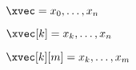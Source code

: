 \documentclass{article}
\newcommand*\xvecBis[1][0]{x_{#1},\ldots,\xvecBisInt}
\newcommand*\xvecBisInt[1][n]{x_{#1}}
\begin{document}
$\xvec = \xvecBis$

$\xvec[k] = \xvecBis[k]$

$\xvec[k][m] = \xvecBis[k][m]$
\end{document}
